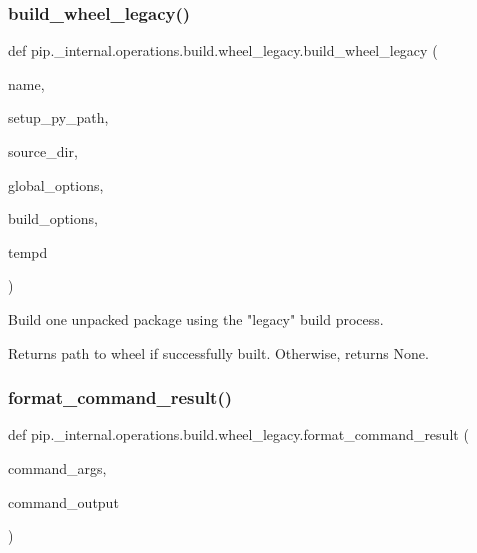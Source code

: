 \subsubsection{\texorpdfstring{build\+\_\+wheel\+\_\+legacy()}{build\_wheel\_legacy()}}
{\footnotesize\ttfamily def pip.\+\_\+internal.\+operations.\+build.\+wheel\+\_\+legacy.\+build\+\_\+wheel\+\_\+legacy (\begin{DoxyParamCaption}\item[{}]{name,  }\item[{}]{setup\+\_\+py\+\_\+path,  }\item[{}]{source\+\_\+dir,  }\item[{}]{global\+\_\+options,  }\item[{}]{build\+\_\+options,  }\item[{}]{tempd }\end{DoxyParamCaption})}

\begin{DoxyVerb}Build one unpacked package using the "legacy" build process.

Returns path to wheel if successfully built. Otherwise, returns None.
\end{DoxyVerb}
 \mbox{\label{namespacepip_1_1__internal_1_1operations_1_1build_1_1wheel__legacy_a0d79cb58123323e40ce8f685ec0d5cb7}} 
\subsubsection{\texorpdfstring{format\+\_\+command\+\_\+result()}{format\_command\_result()}}
{\footnotesize\ttfamily def pip.\+\_\+internal.\+operations.\+build.\+wheel\+\_\+legacy.\+format\+\_\+command\+\_\+result (\begin{DoxyParamCaption}\item[{}]{command\+\_\+args,  }\item[{}]{command\+\_\+output }\end{DoxyParamCaption})}

